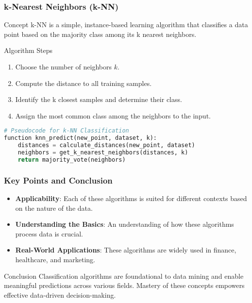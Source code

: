 \documentclass[aspectratio=169]{beamer}
\begin{document}
\begin{frame}[fragile]
    \frametitle{k-Nearest Neighbors (k-NN)}
    \begin{block}{Concept}
        k-NN is a simple, instance-based learning algorithm that classifies a data point based on the majority class among its k nearest neighbors.
    \end{block}
    \begin{block}{Algorithm Steps}
        \begin{enumerate}
            \item Choose the number of neighbors \( k \).
            \item Compute the distance to all training samples.
            \item Identify the k closest samples and determine their class.
            \item Assign the most common class among the neighbors to the input.
        \end{enumerate}
    \end{block}
    \begin{lstlisting}[language=Python, basicstyle=\small]
# Pseudocode for k-NN Classification
function knn_predict(new_point, dataset, k):
    distances = calculate_distances(new_point, dataset)
    neighbors = get_k_nearest_neighbors(distances, k)
    return majority_vote(neighbors)
    \end{lstlisting}
\end{frame}

\begin{frame}
    \frametitle{Key Points and Conclusion}
    \begin{itemize}
        \item \textbf{Applicability}: Each of these algorithms is suited for different contexts based on the nature of the data.
        \item \textbf{Understanding the Basics}: An understanding of how these algorithms process data is crucial.
        \item \textbf{Real-World Applications}: These algorithms are widely used in finance, healthcare, and marketing.
    \end{itemize}
    \begin{block}{Conclusion}
        Classification algorithms are foundational to data mining and enable meaningful predictions across various fields. Mastery of these concepts empowers effective data-driven decision-making.
    \end{block}
\end{frame}
\end{document}
